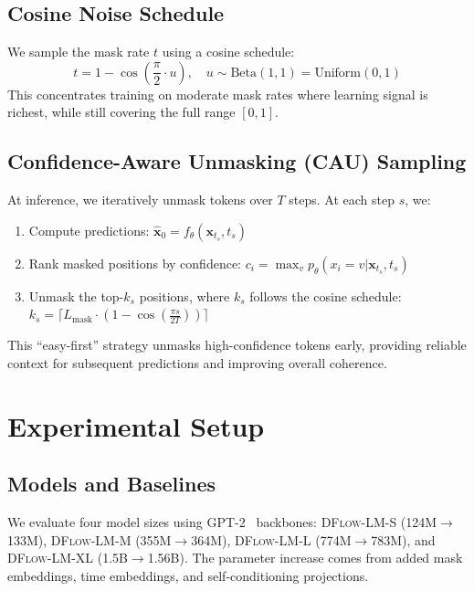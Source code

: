 \documentclass{article}
\newcommand{\ours}{\textsc{DFlow-LM}}
\begin{document}
\subsection{Cosine Noise Schedule}
\label{sec:method:schedule}

We sample the mask rate $t$ using a cosine schedule:
\begin{equation}
    t = 1 - \cos\left(\frac{\pi}{2} \cdot u\right), \quad u \sim \text{Beta}(1, 1) = \text{Uniform}(0, 1)
\end{equation}
This concentrates training on moderate mask rates where learning signal is richest, while still covering the full range $[0, 1]$.

\subsection{Confidence-Aware Unmasking (CAU) Sampling}
\label{sec:method:sampling}

At inference, we iteratively unmask tokens over $T$ steps. At each step $s$, we:
\begin{enumerate}
    \item Compute predictions: $\hat{\mathbf{x}}_0 = f_\theta(\mathbf{x}_{t_s}, t_s)$
    \item Rank masked positions by confidence: $c_i = \max_v p_\theta(x_i = v | \mathbf{x}_{t_s}, t_s)$
    \item Unmask the top-$k_s$ positions, where $k_s$ follows the cosine schedule:
    $k_s = \lceil L_{\text{mask}} \cdot (1 - \cos(\frac{\pi s}{2T})) \rceil$
\end{enumerate}
This ``easy-first'' strategy unmasks high-confidence tokens early, providing reliable context for subsequent predictions and improving overall coherence.

\section{Experimental Setup}
\label{sec:experiments}

\subsection{Models and Baselines}

We evaluate four model sizes using GPT-2~\citep{radford2019language} backbones:
\ours{}-S (124M$\to$133M), \ours{}-M (355M$\to$364M), \ours{}-L (774M$\to$783M), and \ours{}-XL (1.5B$\to$1.56B).
The parameter increase comes from added mask embeddings, time embeddings, and self-conditioning projections.
\end{document}
